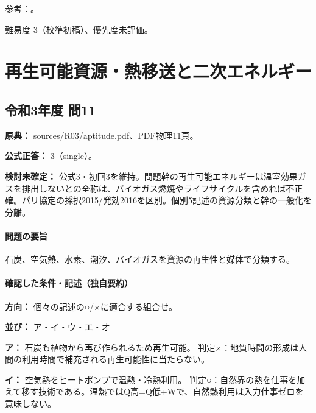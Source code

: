 \par 参考：\cite{eth54_cogen2018,eth54_zeh2018}。

\par 難易度 3（校準初稿）、優先度未評価。

\section{再生可能資源・熱移送と二次エネルギー}

\subsection{令和3年度 問11}
\label{q:r03-reg-apt-11}

\noindent\textbf{原典：} sources/R03/aptitude.pdf、PDF物理11頁。

\textbf{公式正答：} 3（single）。

\par\textbf{検討未確定：} 公式3・初回3を維持。問題幹の再生可能エネルギーは温室効果ガスを排出しないとの全称は、バイオガス燃焼やライフサイクルを含めれば不正確。パリ協定の採択2015/発効2016を区別。個別5記述の資源分類と幹の一般化を分離。

\paragraph{問題の要旨} 石炭、空気熱、水素、潮汐、バイオガスを資源の再生性と媒体で分類する。

\paragraph{確認した条件・記述（独自要約）}\mbox{}\par

\noindent\textbf{方向：} 個々の記述の○/×に適合する組合せ。\par

\noindent\textbf{並び：} ア・イ・ウ・エ・オ\par

\noindent\textbf{ア：} 石炭も植物から再び作られるため再生可能。 判定×：地質時間の形成は人間の利用時間で補充される再生可能性に当たらない。\par

\noindent\textbf{イ：} 空気熱をヒートポンプで温熱・冷熱利用。 判定○：自然界の熱を仕事を加えて移す技術である。温熱ではQ高=Q低+Wで、自然熱利用は入力仕事ゼロを意味しない。\par

